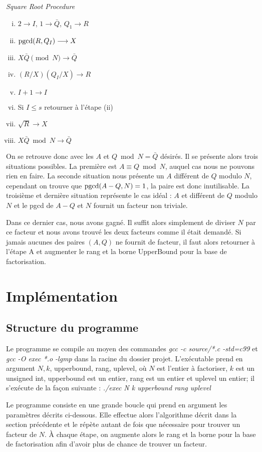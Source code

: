 \documentclass[a4paper]{article} %
\numberwithin{equation}{section}
\begin{document}
\begin{center}\textit{Square Root Procedure}\end{center}
\begin{multicols}{2}
\begin{enumerate}[(i)]
\item $2\longrightarrow I$, $1\longrightarrow \bar{Q}$, $Q_1 \longrightarrow R$
\item $\textup{pgcd}(R, Q_I) \longrightarrow X$
\item $X\bar{Q}\pmod{N}\longrightarrow \bar{Q}$
\item $(R/X)(Q_I/X)\longrightarrow R$
\item $I + 1 \longrightarrow I$
\item Si $I\leq s$ retourner à l'étape (ii)
\item $\sqrt{R}\longrightarrow X$
\item $X\bar{Q}\bmod{N}\longrightarrow \bar{Q}$
\end{enumerate}
\end{multicols}
On se retrouve donc avec les $A$ et $Q \bmod N = \bar{Q}$ désirés. Il se présente alors trois situations possibles. La première est $A \equiv Q \bmod N$, auquel cas nous ne pouvons rien en faire. La seconde situation nous présente un $A$ différent de $Q$ modulo $N$, cependant on trouve que $\textup{pgcd}(A - Q, N) = 1$, la paire est donc inutilisable. La troisième et dernière situation représente le cas idéal : $A$ et différent de $Q$ modulo $N$ et le pgcd de $A - Q$ et $N$ fournit un facteur non triviale.\par
Dans ce dernier cas, nous avons gagné. Il suffit alors simplement de diviser $N$ par ce facteur et nous avons trouvé les deux facteurs comme il était demandé. Si jamais aucunes des paires $(A, Q)$ ne fournit de facteur, il faut alors retourner à l'étape A et augmenter le rang et la borne UpperBound pour la base de factorisation.
\section{Implémentation}
\subsection{Structure du programme}
Le programme se compile au moyen des commandes \textit{gcc -c source/*.c -std=c99} et \textit{gcc -O exec *.o -lgmp} dans la racine du dossier projet. L'exécutable prend en argument $N, k$, upperbound, rang, uplevel, où $N$ est l'entier à factoriser, $k$ est un unsigned int, upperbound est un entier, rang est un entier et uplevel un entier; il s'exécute de la façon suivante :  \textit{./exec N k upperbound rang uplevel}\par
Le programme consiste en une grande boucle qui prend en argument les paramètres décrits ci-dessous. Elle effectue alors l'algorithme décrit dans la section précédente et le répète autant de fois que nécessaire pour trouver un facteur de $N$. À chaque étape, on augmente alors le rang et la borne pour la base de factorisation afin d'avoir plus de chance de trouver un facteur.
\end{document}
